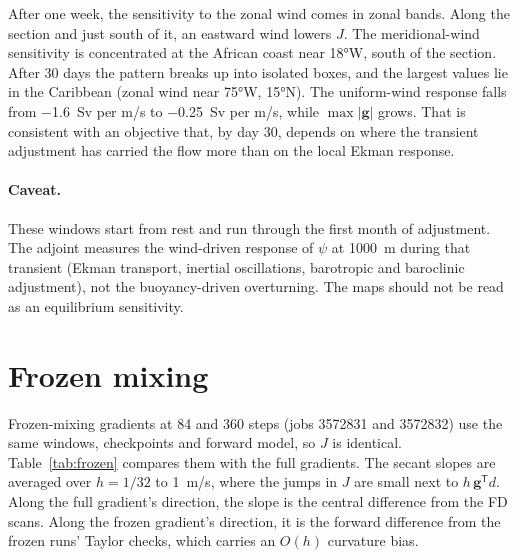 \documentclass[11pt]{article}
\newcommand{\gvec}{\mathbf{g}}
\begin{document}
After one week, the sensitivity to the zonal wind comes in zonal bands. Along the section and just
south of it, an eastward wind lowers $J$. The meridional-wind sensitivity is concentrated at the
African coast near \ang{18}W, south of the section. After 30 days the pattern breaks up into isolated
boxes, and the largest values lie in the Caribbean (zonal wind near \ang{75}W, \ang{15}N). The
uniform-wind response falls from \SI{-1.6}{Sv} per m/s to \SI{-0.25}{Sv} per m/s, while
$\max|\gvec|$ grows. That is consistent with an objective that, by day 30, depends on where the
transient adjustment has carried the flow more than on the local Ekman response.

\paragraph{Caveat.} These windows start from rest and run through the first month of adjustment.
The adjoint measures the wind-driven response of $\psi$ at \SI{1000}{m} during that transient (Ekman
transport, inertial oscillations, barotropic and baroclinic adjustment), not the buoyancy-driven
overturning. The maps should not be read as an equilibrium sensitivity.

\section{Frozen mixing}
\label{sec:frozen}

Frozen-mixing gradients at 84 and 360 steps (jobs 3572831 and 3572832) use the same windows,
checkpoints and forward model, so $J$ is identical. Table~\ref{tab:frozen} compares them with the full
gradients. The secant slopes are averaged over $h = 1/32$ to \SI{1}{m/s}, where the jumps in $J$ are small
next to $h\,\gvec^{\mathsf T}d$. Along the full gradient's direction, the slope is the central difference
from the FD scans. Along the frozen gradient's direction, it is the forward difference from the frozen
runs' Taylor checks, which carries an $O(h)$ curvature bias.
\end{document}
